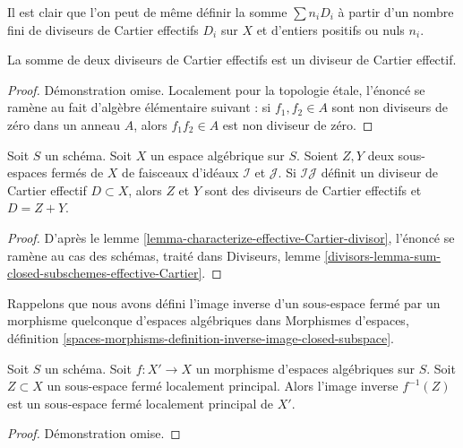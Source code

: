\noindent
Il est clair que l'on peut de même définir la somme $\sum n_iD_i$ à partir
d'un nombre fini de diviseurs de Cartier effectifs $D_i$ sur $X$
et d'entiers positifs ou nuls $n_i$.

\begin{lemma}
\label{lemma-sum-effective-Cartier-divisors}
La somme de deux diviseurs de Cartier effectifs est un diviseur de
Cartier effectif.
\end{lemma}

\begin{proof}
Démonstration omise. Localement pour la topologie \'etale, l'énoncé se ramène au
fait d'algèbre élémentaire suivant : si $f_1, f_2 \in A$ sont non diviseurs de zéro dans un anneau $A$, alors
$f_1f_2 \in A$ est non diviseur de zéro.
\end{proof}

\begin{lemma}
\label{lemma-sum-closed-subschemes-effective-Cartier}
Soit $S$ un schéma. Soit $X$ un espace algébrique sur $S$.
Soient $Z, Y$ deux sous-espaces fermés de $X$
de faisceaux d'idéaux $\mathcal{I}$ et $\mathcal{J}$. Si $\mathcal{I}\mathcal{J}$
définit un diviseur de Cartier effectif $D \subset X$, alors $Z$ et $Y$
sont des diviseurs de Cartier effectifs et $D = Z + Y$.
\end{lemma}

\begin{proof}
D'après le lemme \ref{lemma-characterize-effective-Cartier-divisor},
l'énoncé se ramène au cas des schémas, traité dans
Diviseurs, lemme \ref{divisors-lemma-sum-closed-subschemes-effective-Cartier}.
\end{proof}

\noindent
Rappelons que nous avons défini l'image inverse d'un sous-espace fermé
par un morphisme quelconque d'espaces algébriques dans
Morphismes d'espaces, définition
\ref{spaces-morphisms-definition-inverse-image-closed-subspace}.

\begin{lemma}
\label{lemma-pullback-locally-principal}
Soit $S$ un schéma.
Soit $f : X' \to X$ un morphisme d'espaces algébriques sur $S$.
Soit $Z \subset X$ un sous-espace fermé localement principal.
Alors l'image inverse $f^{-1}(Z)$ est un sous-espace fermé localement
principal de $X'$.
\end{lemma}

\begin{proof}
Démonstration omise.
\end{proof}

